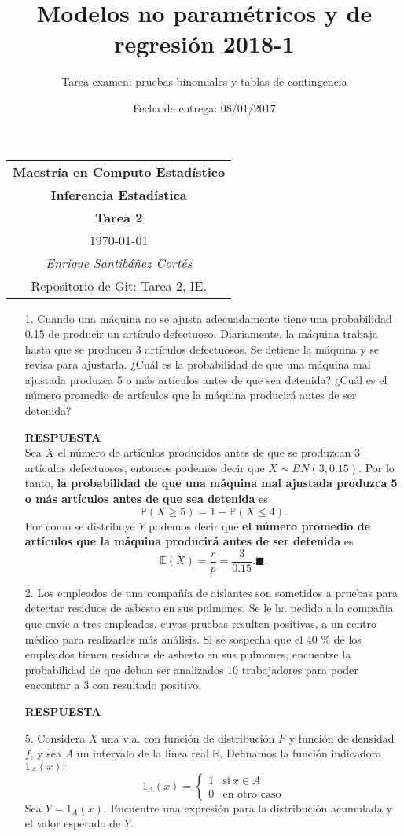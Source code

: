 \documentclass[11pt,letterpaper]{article}
\title{Modelos no paramétricos y de regresión 2018-1}
\author{Tarea examen: pruebas binomiales y tablas de contingencia}
\date{Fecha de entrega: 08/01/2017}
\newcommand{\mP}{\mathbb{P}}
\newcommand{\mE}{\mathbb{E}}
\newcommand{\res}{\textbf{RESPUESTA}\\}
\newcommand{\finf}{\blacksquare.}
\begin{document}
\begin{table}[ht]
\centering
\begin{tabular}{c}
\textbf{Maestría en Computo Estadístico}\\
\textbf{Inferencia Estadística} \\
\textbf{Tarea 2}\\
\today \\
\emph{Enrique Santibáñez Cortés}\\
Repositorio de Git: \href{https://github.com/Enriquesec/Inferencia_Estad-stica/tree/master/Tareas/Tarea_2}{Tarea 2, IE}.
\end{tabular}
\end{table}

\begin{itemize}
\item[1.] Cuando una máquina no se ajusta adecuadamente tiene una probabilidad 0.15 de producir un artículo defectuoso. Diariamente, la máquina trabaja hasta que se producen 3 artículos defectuosos. Se detiene la máquina y se revisa para ajustarla. ¿Cuál es la probabilidad de que una máquina mal ajustada produzca 5 o más artículos antes de que sea detenida? ¿Cuál es el número promedio de artículos que la máquina producirá antes de ser detenida?

\res
Sea $X$ el número de artículos producidos antes de que se produzcan 3 artículos defectuosos, entonces podemos decir que $X\sim BN(3,0.15).$ Por lo tanto, \textbf{la probabilidad de que una máquina mal ajustada produzca 5 o más artículos antes de que sea detenida} es
$$\mP(X\geq 5) =1-\mP(X\leq 4).$$
Por como se distribuye $Y$ podemos decir que \textbf{el número promedio de artículos que la máquina producirá antes de ser detenida} es
$$\mE(X)=\frac{r}{p}=\frac{3}{0.15}. \finf$$

\item[2.] Los empleados de una compañía de aislantes son sometidos a pruebas para detectar residuos de asbesto en sus pulmones. Se le ha pedido a la compañía que envíe a tres empleados, cuyas pruebas resulten positivas, a un centro médico para realizarles más análisis. Si se sospecha que el 40 \% de los empleados tienen residuos de asbesto en sus pulmones, encuentre la probabilidad de que deban ser analizados 10 trabajadores para poder encontrar a 3 con resultado positivo.

\res


\item[5.] Considera $X$ una v.a. con función de distribución $F$ y función de densidad $f$, y sea $A$ un intervalo de la línea real $\mathbb{R}$. Definamos la función indicadora $1_{A}(x):$
\begin{equation*}
1_{A}(x) = \left\{\begin{array}{ccr}
1 & \text{si} \ x\in A\\
0 & \text{en otro caso}
\end{array}\right.
\end{equation*}
Sea $Y=1_{A}(x).$ Encuentre una expresión para la distribución acumulada y el valor esperado de $Y$. 


\end{itemize}
\end{document}

